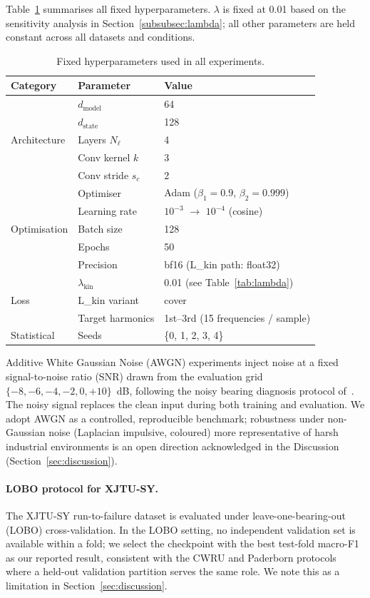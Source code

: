 Table~\ref{tab:hyperparams} summarises all fixed hyperparameters.
$\lambda$ is fixed at 0.01 based on the sensitivity analysis in
Section~\ref{subsubsec:lambda}; all other parameters are held constant
across all datasets and conditions.

\begin{table}[htbp]
\centering
\caption{Fixed hyperparameters used in all experiments.}
\label{tab:hyperparams}
\begin{tabular}{lll}
\toprule
Category & Parameter & Value \\
\midrule
\multirow{5}{*}{Architecture}
  & $d_{\text{model}}$ & 64 \\
  & $d_{\text{state}}$ & 128 \\
  & Layers $N_\ell$    & 4 \\
  & Conv kernel $k$    & 3 \\
  & Conv stride $s_c$  & 2 \\
\midrule
\multirow{5}{*}{Optimisation}
  & Optimiser         & Adam ($\beta_1=0.9$, $\beta_2=0.999$) \\
  & Learning rate     & $10^{-3}$ $\to$ $10^{-4}$ (cosine) \\
  & Batch size        & 128 \\
  & Epochs            & 50 \\
  & Precision         & bf16 (L\_kin path: float32) \\
\midrule
\multirow{3}{*}{Loss}
  & $\lambda_{\text{kin}}$ & 0.01 (see Table~\ref{tab:lambda}) \\
  & L\_kin variant    & cover \\
  & Target harmonics  & 1st--3rd (15 frequencies / sample) \\
\midrule
Statistical
  & Seeds             & \{0, 1, 2, 3, 4\} \\
\bottomrule
\end{tabular}
\end{table}

Additive White Gaussian Noise (AWGN) experiments inject noise at a fixed
signal-to-noise ratio (SNR) drawn from the evaluation grid
$\{-8,-6,-4,-2,0,+10\}$~dB, following the noisy bearing diagnosis
protocol of~\cite{zhang2020deep}.
The noisy signal replaces the clean input during both training and evaluation.
We adopt AWGN as a controlled, reproducible benchmark; robustness under
non-Gaussian noise (Laplacian impulsive, coloured) more representative of
harsh industrial environments is an open direction acknowledged in the
Discussion (Section~\ref{sec:discussion}).

\paragraph{LOBO protocol for XJTU-SY.}
The XJTU-SY run-to-failure dataset is evaluated under leave-one-bearing-out
(LOBO) cross-validation.
In the LOBO setting, no independent validation set is available within a fold;
we select the checkpoint with the best test-fold macro-F1 as our reported
result, consistent with the CWRU and Paderborn protocols where a held-out
validation partition serves the same role.
We note this as a limitation in Section~\ref{sec:discussion}.

